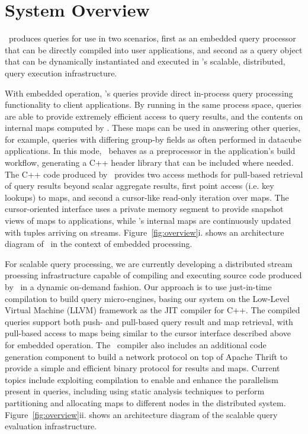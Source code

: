 \section{System Overview}

\compiler\ produces queries for use in two scenarios, first as an embedded query
processor that can be directly compiled into user applications, and second as a
query object that can be dynamically instantiated and executed in \compiler's
scalable, distributed, query execution infrastructure.

With embedded operation, \compiler's queries provide direct in-process query
processing functionality to client applications. By running in the same process
space, queries are able to provide extremely efficient access to query results,
and the contents on internal maps computed by \compiler. These maps can be used
in answering other queries, for example, queries with differing group-by fields
as often performed in datacube applications.
In this mode, \compiler\ behaves as a preprocessor in the application's build
workflow, generating a C++ header library that can be included where needed.
The C++ code produced by \compiler\ provides two access methods for pull-based
retrieval of query results beyond scalar aggregate results, first point access
(i.e. key lookups) to maps, and second a cursor-like read-only iteration over
maps. The cursor-oriented interface uses a private memory segment to provide
snapshot views of maps to applications, while \compiler's internal maps are
continuously updated with tuples arriving on streams.
Figure~\ref{fig:overview}i. shows an architecture diagram of \compiler\ in the
context of embedded processing.

For scalable query processing, we are currently developing a distributed stream
proessing infrastructure capable of compiling and executing source code produced
by \compiler\ in a dynamic on-demand fashion. Our approach is to use
just-in-time compilation to build query micro-engines, basing our system on the
Low-Level Virtual Machine (LLVM) framework as the JIT compiler for C++. The
compiled queries support both push- and pull-based query result and map
retrieval, with pull-based access to maps being similar to the cursor interface
described above for embedded operation. The \compiler\ compiler also includes an
additional code generation component to build a network protocol on top of
Apache Thrift to provide a simple and efficient binary protocol for results and
maps. Current topics include exploiting compilation to enable and enhance the
parallelism present in queries, including using static analysis techniques to
perform partitioning and allocating maps to different nodes in the distributed
system. Figure~\ref{fig:overview}ii. shows an architecture diagram of the
scalable query evaluation infrastructure.